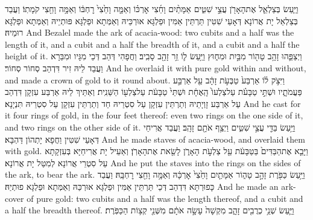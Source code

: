\newperek
{}
{וַיַּ֧עַשׂ בְּצַלְאֵ֛ל אֶת\maqqaf הָאָרֹ֖ן עֲצֵ֣י שִׁטִּ֑ים אַמָּתַ֨יִם וָחֵ֜צִי אׇרְכּ֗וֹ וְאַמָּ֤ה וָחֵ֙צִי֙ רׇחְבּ֔וֹ וְאַמָּ֥ה וָחֵ֖צִי קֹמָתֽוֹ׃}
{וַעֲבַד בְּצַלְאֵל יָת אֲרוֹנָא דְּאָעֵי שִׁטִּין תַּרְתֵּין אַמִּין וּפַלְגָּא אוּרְכֵּיהּ וְאַמְּתָא וּפַלְגָּא פּוּתְיֵיהּ וְאַמְּתָא וּפַלְגָּא רוּמֵיהּ׃}
{And Bezalel made the ark of acacia-wood: two cubits and a half was the length of it, and a cubit and a half the breadth of it, and a cubit and a half the height of it.}{}
{וַיְצַפֵּ֛הוּ זָהָ֥ב טָה֖וֹר מִבַּ֣יִת וּמִח֑וּץ וַיַּ֥עַשׂ ל֛וֹ זֵ֥ר זָהָ֖ב סָבִֽיב׃}
{וַחֲפָהִי דְּהַב דְּכֵי מִגָּיו וּמִבַּרָא וַעֲבַד לֵיהּ זִיר דִּדְהַב סְחוֹר סְחוֹר׃}
{And he overlaid it with pure gold within and without, and made a crown of gold to it round about.}{}
{וַיִּצֹ֣ק ל֗וֹ אַרְבַּע֙ טַבְּעֹ֣ת זָהָ֔ב עַ֖ל אַרְבַּ֣ע פַּעֲמֹתָ֑יו וּשְׁתֵּ֣י טַבָּעֹ֗ת עַל\maqqaf צַלְעוֹ֙ הָֽאֶחָ֔ת וּשְׁתֵּי֙ טַבָּעֹ֔ת עַל\maqqaf צַלְע֖וֹ הַשֵּׁנִֽית׃}
{וְאַתֵּיךְ לֵיהּ אַרְבַּע עִזְקָן דִּדְהַב עַל אַרְבַּע זָוְיָתֵיהּ וְתַרְתֵּין עִזְקָן עַל סִטְרֵיהּ חַד וְתַרְתֵּין עִזְקָן עַל סִטְרֵיהּ תִּנְיָנָא׃}
{And he cast for it four rings of gold, in the four feet thereof: even two rings on the one side of it, and two rings on the other side of it.}{}
{וַיַּ֥עַשׂ בַּדֵּ֖י עֲצֵ֣י שִׁטִּ֑ים וַיְצַ֥ף אֹתָ֖ם זָהָֽב׃}
{וַעֲבַד אֲרִיחֵי דְּאָעֵי שִׁטִּין וַחֲפָא יָתְהוֹן דַּהְבָּא׃}
{And he made staves of acacia-wood, and overlaid them with gold.}{}
{וַיָּבֵ֤א אֶת\maqqaf הַבַּדִּים֙ בַּטַּבָּעֹ֔ת עַ֖ל צַלְעֹ֣ת הָאָרֹ֑ן לָשֵׂ֖את אֶת\maqqaf הָאָרֹֽן׃}
{וְאַעֵיל יָת אֲרִיחַיָּא בְּעִזְקָתָא עַל סִטְרֵי אֲרוֹנָא לְמִטַּל יָת אֲרוֹנָא׃}
{And he put the staves into the rings on the sides of the ark, to bear the ark.}{}
{וַיַּ֥עַשׂ כַּפֹּ֖רֶת זָהָ֣ב טָה֑וֹר אַמָּתַ֤יִם וָחֵ֙צִי֙ אׇרְכָּ֔הּ וְאַמָּ֥ה וָחֵ֖צִי רׇחְבָּֽהּ׃}
{וַעֲבַד כָּפוּרְתָּא דִּדְהַב דְּכֵי תַּרְתֵּין אַמִּין וּפַלְגָּא אוּרְכַּהּ וְאַמְּתָא וּפַלְגָּא פוּתְיַהּ׃}
{And he made an ark-cover of pure gold: two cubits and a half was the length thereof, and a cubit and a half the breadth thereof.}{}
{וַיַּ֛עַשׂ שְׁנֵ֥י כְרֻבִ֖ים זָהָ֑ב מִקְשָׁה֙ עָשָׂ֣ה אֹתָ֔ם מִשְּׁנֵ֖י קְצ֥וֹת הַכַּפֹּֽרֶת׃}
